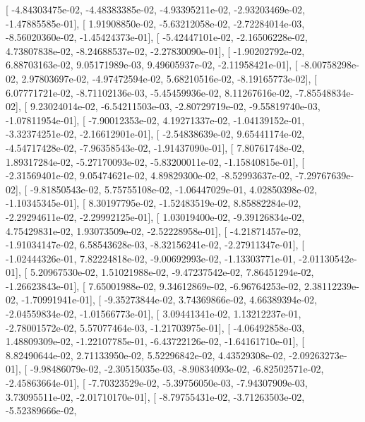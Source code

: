 \documentclass{article}
\begin{document}
       [ -4.84303475e-02,  -4.48383385e-02,  -4.93395211e-02,
         -2.93203469e-02,  -1.47885585e-01],
       [  1.91908850e-02,  -5.63212058e-02,  -2.72284014e-03,
         -8.56020360e-02,  -1.45424373e-01],
       [ -5.42447101e-02,  -2.16506228e-02,   4.73807838e-02,
         -8.24688537e-02,  -2.27830090e-01],
       [ -1.90202792e-02,   6.88703163e-02,   9.05171989e-03,
          9.49605937e-02,  -2.11958421e-01],
       [ -8.00758298e-02,   2.97803697e-02,  -4.97472594e-02,
          5.68210516e-02,  -8.19165773e-02],
       [  6.07771721e-02,  -8.71102136e-03,  -5.45459936e-02,
          8.11267616e-02,  -7.85548834e-02],
       [  9.23024014e-02,  -6.54211503e-03,  -2.80729719e-02,
         -9.55819740e-03,  -1.07811954e-01],
       [ -7.90012353e-02,   4.19271337e-02,  -1.04139152e-01,
         -3.32374251e-02,  -2.16612901e-01],
       [ -2.54838639e-02,   9.65441174e-02,  -4.54717428e-02,
         -7.96358543e-02,  -1.91437090e-01],
       [  7.80761748e-02,   1.89317284e-02,  -5.27170093e-02,
         -5.83200011e-02,  -1.15840815e-01],
       [ -2.31569401e-02,   9.05474621e-02,   4.89829300e-02,
         -8.52993637e-02,  -7.29767639e-02],
       [ -9.81850543e-02,   5.75755108e-02,  -1.06447029e-01,
          4.02850398e-02,  -1.10345345e-01],
       [  8.30197795e-02,  -1.52483519e-02,   8.85882284e-02,
         -2.29294611e-02,  -2.29992125e-01],
       [  1.03019400e-02,  -9.39126834e-02,   4.75429831e-02,
          1.93073509e-02,  -2.52228958e-01],
       [ -4.21871457e-02,  -1.91034147e-02,   6.58543628e-03,
         -8.32156241e-02,  -2.27911347e-01],
       [ -1.02444326e-01,   7.82224818e-02,  -9.00692993e-02,
         -1.13303771e-01,  -2.01130542e-01],
       [  5.20967530e-02,   1.51021988e-02,  -9.47237542e-02,
          7.86451294e-02,  -1.26623843e-01],
       [  7.65001988e-02,   9.34612869e-02,  -6.96764253e-02,
          2.38112239e-02,  -1.70991941e-01],
       [ -9.35273844e-02,   3.74369866e-02,   4.66389394e-02,
         -2.04559834e-02,  -1.01566773e-01],
       [  3.09441341e-02,   1.13212237e-01,  -2.78001572e-02,
          5.57077464e-03,  -1.21703975e-01],
       [ -4.06492858e-03,   1.48809309e-02,  -1.22107785e-01,
         -6.43722126e-02,  -1.64161710e-01],
       [  8.82490644e-02,   2.71133950e-02,   5.52296842e-02,
          4.43529308e-02,  -2.09263273e-01],
       [ -9.98486079e-02,  -2.30515035e-03,  -8.90834093e-02,
         -6.82502571e-02,  -2.45863664e-01],
       [ -7.70323529e-02,  -5.39756050e-03,  -7.94307909e-03,
          3.73095511e-02,  -2.01710170e-01],
       [ -8.79755431e-02,  -3.71263503e-02,  -5.52389666e-02,
\end{document}
